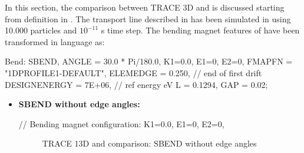 In this section, the comparison between TRACE 3D and \opalt is discussed starting from  definition in \opalt. The transport line described in  has been simulated in \opal using 10.000 particles and $10^{-11}$ s time step. The bending magnet features of  have been transformed in \opal language as:

\begin{example}
Bend: SBEND, ANGLE = 30.0 * Pi/180.0,
             K1=0.0,
             E1=0, E2=0,
             FMAPFN = "1DPROFILE1-DEFAULT",
             ELEMEDGE = 0.250,  // end of first drift
             DESIGNENERGY = 7E+06,  // ref energy eV
             L = 0.1294,
             GAP = 0.02;
\end{example}

\begin{itemize}

\item \textbf{SBEND without edge angles:}

\begin{example}
// Bending magnet configuration:
K1=0.0,
E1=0, E2=0,
\end{example}

\begin{figure}[htbp]
\begin{center}
    \hspace{1.8cm}
    \caption{TRACE 13D and \opal comparison: SBEND without edge angles}
    \label{fig:SBEND_noEdge}
\end{center}
 \end{figure}


\end{itemize}
